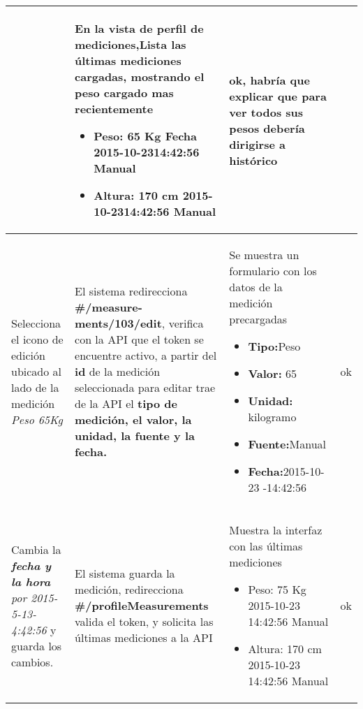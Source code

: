 {\begin{longtable}{|p{4cm}|p{4cm}|p{4cm}|p{3cm}|}
  				& En la vista de perfil de mediciones,Lista las últimas mediciones cargadas,
  				mostrando el peso cargado mas recientemente
  				
  				\begin{itemize}
  					\item Peso: 65 Kg Fecha 2015-10-2314:42:56 Manual
  					\item Altura: 170 cm 2015-10-2314:42:56 Manual
  					
  				\end{itemize}
  				& ok, habría que explicar que para ver todos sus pesos debería dirigirse a histórico
  				
  				\\ \hline
  				
  				
  				
  				
  				
  				
  				Selecciona el icono de edición ubicado al lado de la medición \textit{Peso 65Kg}
  				& El sistema redirecciona \textbf{\#/measure-ments/103/edit}, verifica con la API que el token se encuentre activo, a partir del\textbf{ id} de la medición seleccionada para editar trae de la API el \textbf{tipo de medición, el valor, la unidad, la fuente y la fecha.}
  				
  				& Se muestra un formulario con los datos de la medición precargadas
  				\begin{itemize}
  					\item \textbf{Tipo:}Peso 
  					\item \textbf{Valor: }65 
  					\item \textbf{Unidad:} kilogramo
  					\item \textbf{Fuente:}Manual 
  					\item \textbf{Fecha:}2015-10-23 -14:42:56
  				\end{itemize}
  				&  ok
  				\\ \hline
  				
  				
  				
  				
  				
  				Cambia la \textit{\textbf{fecha y la hora} por 2015-5-13- 4:42:56 }y guarda los cambios.
  				& El sistema guarda la medición, redirecciona\textbf{ \#/profileMeasurements }valida el token, y solicita las últimas mediciones a la API
  				
  				& Muestra la interfaz con las últimas mediciones 
  				\begin{itemize}
  					\item Peso: 75 Kg 2015-10-23 14:42:56 Manual 
  					\item Altura: 170 cm 2015-10-23 14:42:56 Manual
  				\end{itemize}
  				& ok
  				\\ \hline
  				

\end{longtable}}
